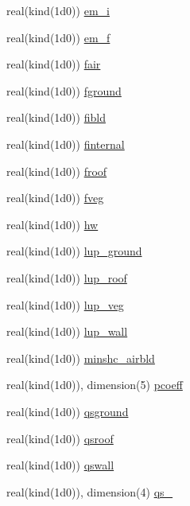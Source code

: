 \begin{DoxyCompactItemize}
\item 
real(kind(1d0)) \hyperlink{namespaceestm__data_a8fd7327f01717b62ccea848081385634}{em\+\_\+i}
\item 
real(kind(1d0)) \hyperlink{namespaceestm__data_ab7d39c4c162023ce9dbe29351fc13f7c}{em\+\_\+f}
\item 
real(kind(1d0)) \hyperlink{namespaceestm__data_a350989730ec91fcf195ed06a6a7c4fa7}{fair}
\item 
real(kind(1d0)) \hyperlink{namespaceestm__data_a9b01f3d94dbedc581011bbcfc3a66f5a}{fground}
\item 
real(kind(1d0)) \hyperlink{namespaceestm__data_a7d50043d64fcdfb8c7d6ad60d17cf899}{fibld}
\item 
real(kind(1d0)) \hyperlink{namespaceestm__data_ab51560756cfb7c322c529a79e60c1e41}{finternal}
\item 
real(kind(1d0)) \hyperlink{namespaceestm__data_a1fd10be127e3b3f05b97d60a4942f5b9}{froof}
\item 
real(kind(1d0)) \hyperlink{namespaceestm__data_ae5a720a9242a6d2110418f2d946a2575}{fveg}
\item 
real(kind(1d0)) \hyperlink{namespaceestm__data_ae0ab410b6628c40338fc7cea2a358363}{hw}
\item 
real(kind(1d0)) \hyperlink{namespaceestm__data_a234bc794c013bfddb122adb36d66ccce}{lup\+\_\+ground}
\item 
real(kind(1d0)) \hyperlink{namespaceestm__data_a5558ed804a2422c76b44ba02ce96305b}{lup\+\_\+roof}
\item 
real(kind(1d0)) \hyperlink{namespaceestm__data_a94b51266617e7bd1ed54b5f0be2a6041}{lup\+\_\+veg}
\item 
real(kind(1d0)) \hyperlink{namespaceestm__data_a96c7c219d9a864a8ca953f76d071846e}{lup\+\_\+wall}
\item 
real(kind(1d0)) \hyperlink{namespaceestm__data_a4376f642f063a592c13354381436ceaa}{minshc\+\_\+airbld}
\item 
real(kind(1d0)), dimension(5) \hyperlink{namespaceestm__data_a7f399d89721620a96604b14fbbceb842}{pcoeff}
\item 
real(kind(1d0)) \hyperlink{namespaceestm__data_ab1d9bb697a8d9aa36c61f312c561e7f4}{qsground}
\item 
real(kind(1d0)) \hyperlink{namespaceestm__data_aa18b673d46a2acdcdbb40997a3ddab0b}{qsroof}
\item 
real(kind(1d0)) \hyperlink{namespaceestm__data_aafce9cf85961d2bdc97dcd69019884d6}{qswall}
\item 
real(kind(1d0)), dimension(4) \hyperlink{namespaceestm__data_a6e7238f21142ff1e6b7b2482ff279191}{qs\+\_}

\end{DoxyCompactItemize}
